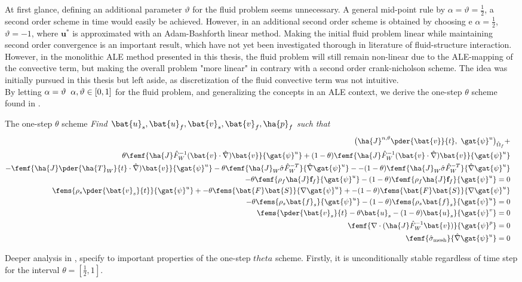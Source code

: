 At first glance, defining an additional parameter $\vartheta$ for the fluid problem seems unnecessary. A general mid-point rule by  $\alpha = \vartheta = \frac{1}{2}$, a second order scheme in time would easily be achieved. However, in \cite{Simo1994} an additional second order scheme is obtained by choosing e $\alpha = \frac{1}{2}$,  $\vartheta =-1$, where  $\mathbf{u}^{*}$ is approximated with an Adam-Bashforth linear method. Making the initial fluid problem linear while maintaining second order convergence is an important result, which have not yet been investigated thorough in literature of fluid-structure interaction.  However, in the monolithic  ALE method presented in this thesis, the fluid problem will still remain non-linear due to the ALE-mapping of the convective term, but making the overall problem "more linear" in contrary with a second order crank-nicholson scheme. The idea was initially pursued in this thesis but left aside, as discretization of the fluid convective term was not intuitive.  \\
By letting $\alpha = \vartheta \hspace{2mm} \alpha, \vartheta \in [0, 1] $ for the fluid problem, and generalizing the concepts in an ALE context, we derive the one-step $\theta$ scheme found in \cite{Wicka}.
\begin{prob}
The one-step $\theta$ scheme 
\textit{Find $\bat{u}_s, \bat{u}_f, \bat{v}_s, \bat{v}_f, \ha{p}_f $ such that}
\begin{align*}
\big(\ha{J}^{n, \theta} \pder{\bat{v}}{t}, \ \gat{\psi}^u \big)_{\hat{\Omega}_f} + \\
\theta \femf{\ha{J} \hat{F}_W^{-1}(\bat{v} \cdot \hat{\nabla}) \bat{v}}
{\gat{\psi}^u} + 
(1 - \theta) \femf{\ha{J} \hat{F}_W^{-1}(\bat{v} \cdot \hat{\nabla}) \bat{v}}
{\gat{\psi}^u} \\
- \femf{\ha{J}  \pder{\ha{T}_W}{t} \cdot \hat{\nabla}) \bat{v}}
{\gat{\psi}^u}
-\theta \femf{\ha{J}_W \hat{\sigma}\hat{F}_W^{-T}}{\hat{\nabla}\gat{\psi}^u} -
- (1 - \theta) \femf{\ha{J}_W \hat{\sigma}\hat{F}_W^{-T}}{\hat{\nabla}\gat{\psi}^u} \\
- \theta \femf{\rho_f \ha{J} \mathbf{f}_f}{{\gat{\psi}^u}} - 
(1 - \theta) \femf{\rho_f \ha{J} \mathbf{f}_f}{{\gat{\psi}^u}}= 0& \\
\fems{\rho_s \pder{\bat{v}_s}{t}}{\gat{\psi}^u} + 
- \theta\fems{\bat{F}\bat{S}}{\nabla \gat{\psi}^u}  + 
- (1 - \theta) \fems{\bat{F}\bat{S}}{\nabla \gat{\psi}^u} \\
- \theta \fems{\rho_s \bat{f}_s}{\gat{\psi}^u} 
- (1 - \theta) \fems{\rho_s \bat{f}_s}{\gat{\psi}^u} = 0 \\
\fems{\pder{\bat{v}_s}{t} - \theta \bat{u}_s - (1 - \theta)\bat{u}_s}{\gat{\psi}^v}  = 0&\\
\femf{\nabla \cdot (\ha{J} \hat{F}_W^{-1} \bat{v})}{\gat{\psi}^p} = 0& \\
\femf{\hat{\sigma}_{\text{mesh}}}{\hat{\nabla}\gat{\psi}^u} = 0&
\end{align*} 
\end{prob}
Deeper analysis in  \cite{Wicka}, specify to important properties of the one-step $theta$ scheme. Firstly, it is unconditionally stable regardless of time step for the interval $\theta = [\frac{1}{2}, 1]$. 
